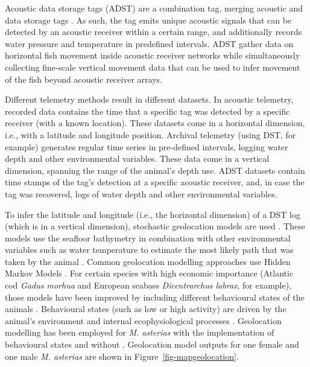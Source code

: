 \documentclass[
  authoryear,
  review,
  3p]{elsarticle}
\begin{document}
Acoustic data storage tags (ADST) are a combination tag, merging
acoustic and data storage tags \citep{goossens_2023}. As such, the tag
emits unique acoustic signals that can be detected by an acoustic
receiver within a certain range, and additionally records water pressure
and temperature in predefined intervals. ADST gather data on horizontal
fish movement inside acoustic receiver networks while simultaneously
collecting fine-scale vertical movement data that can be used to infer
movement of the fish beyond acoustic receiver arrays.

Different telemetry methods result in different datasets. In acoustic
telemetry, recorded data contains the time that a specific tag was
detected by a specific receiver (with a known location). These datasets
come in a horizontal dimension, i.e., with a latitude and longitude
position. Archival telemetry (using DST, for example) generates regular
time series in pre-defined intervals, logging water depth and other
environmental variables. These data come in a vertical dimension,
spanning the range of the animal's depth use. ADST datasets contain time
stamps of the tag's detection at a specific acoustic receiver, and, in
case the tag was recovered, logs of water depth and other environmental
variables.

To infer the latitude and longitude (i.e., the horizontal dimension) of
a DST log (which is in a vertical dimension), stochastic geolocation
models are used \citep{gatti_2021}. These models use the seafloor
bathymetry in combination with other environmental variables such as
water temperature to estimate the most likely path that was taken by the
animal \citep{nielsen_2004, gatti_2021}. Common geolocation modelling
approaches use Hidden Markov Models
\citep[HMM,][]{pedersen_2008, woillez_2016}. For certain species with
high economic importance (Atlantic cod \emph{Gadus morhua} and European
seabass \emph{Dicentrarchus labrax}, for example), those models have
been improved by including different behavioural states of the animals
\citep{pedersen_2008, heerah_2017}. Behavioural states (such as low or
high activity) are driven by the animal's environment and internal
ecophysiological processes \citep{gurarie_2016}. Geolocation modelling
has been employed for \emph{M. asterias} with the implementation of
behavioural states \citep[following the approach by][]{pedersen_2008}
and without \citep{goossens_2023}. Geolocation model outputs for one
female and one male \emph{M. asterias} are shown in
Figure~\ref{fig-mapgeolocation}.
\end{document}
